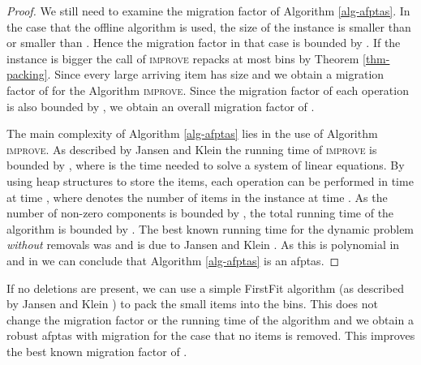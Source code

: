 \begin{proof}
    We still need to examine the migration factor of Algorithm \ref{alg-afptas}. In the case that the offline algorithm is used, the size of the instance is smaller than  or smaller than . Hence the migration factor in that case is bounded by . If the instance is bigger the call of \textsc{improve} repacks at most  bins by Theorem \ref{thm-packing}. Since every large arriving item has size  and  we obtain a migration factor of  for the Algorithm \textsc{improve}. Since the migration factor of each operation is also bounded by , we obtain an overall migration factor of . 
    
    The main complexity of Algorithm \ref{alg-afptas} lies in the use of
    Algorithm \textsc{improve}. As described by Jansen and Klein
    \cite{jansen2013binpacking} the running time of \textsc{improve} is
    bounded by , where  is the time needed to
    solve a system of  linear equations. By using heap structures to
    store the items, each operation can be performed in time
     at
    time , where  denotes the number of items in the instance
    at time . As the number of non-zero components is bounded by
    , the total running time of the
    algorithm is bounded by . The best known running time for the dynamic \BP problem
    \emph{without} removals was
     and is due to
    Jansen and Klein \cite{jansen2013binpacking}.  As this is polynomial
    in  and in  we can conclude that
    Algorithm \ref{alg-afptas} is an \ac{afptas}.
\end{proof}

If no deletions are present, we can use a simple FirstFit algorithm (as described by Jansen and Klein \cite{jansen2013binpacking}) to pack the small items into the bins. This does not change the migration factor or the running time of the algorithm and we obtain a robust \ac{afptas} with  migration for the case that no items is removed. This improves the best known migration factor of  \cite{jansen2013binpacking}.



















